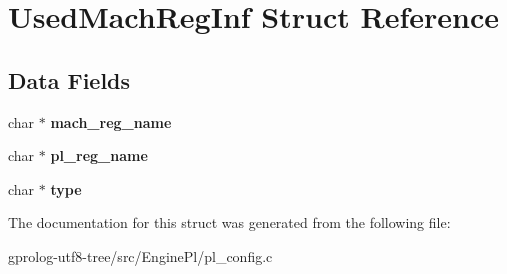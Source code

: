 \hypertarget{structUsedMachRegInf}{}\section{Used\+Mach\+Reg\+Inf Struct Reference}
\label{structUsedMachRegInf}
\subsection*{Data Fields}
\begin{DoxyCompactItemize}
\item 
char $\ast$ {\bfseries mach\+\_\+reg\+\_\+name}\hypertarget{structUsedMachRegInf_a469dabfeaa37fca00d87667d4dacc064}{}\label{structUsedMachRegInf_a469dabfeaa37fca00d87667d4dacc064}

\item 
char $\ast$ {\bfseries pl\+\_\+reg\+\_\+name}\hypertarget{structUsedMachRegInf_a9a0e95f20d942e8610a0e905bafc7353}{}\label{structUsedMachRegInf_a9a0e95f20d942e8610a0e905bafc7353}

\item 
char $\ast$ {\bfseries type}\hypertarget{structUsedMachRegInf_a2e0c08014802409c0a340c61fab7dafe}{}\label{structUsedMachRegInf_a2e0c08014802409c0a340c61fab7dafe}

\end{DoxyCompactItemize}


The documentation for this struct was generated from the following file\+:\begin{DoxyCompactItemize}
\item 
gprolog-\/utf8-\/tree/src/\+Engine\+Pl/pl\+\_\+config.\+c\end{DoxyCompactItemize}
